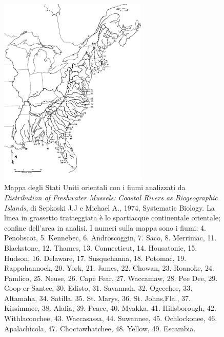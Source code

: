 \documentclass{article} %
\begin{document}
\begin{figure}[H]
    \centering
    \includegraphics[width=0.63\textwidth]{immagini/usa.png}
    \caption{Mappa degli Stati Uniti orientali con i fiumi analizzati da \textit{Distribution of Freshwater Mussels: Coastal Rivers as Biogeographic Islands}, di Sepkoski J.J e Michael A., 1974, Systematic Biology. La linea in grassetto tratteggiata è lo spartiacque continentale orientale; confine dell'area in analisi. I numeri sulla mappa sono i fiumi: 4. Penobscot, 5. Kennebec, 6. Androscoggin, 7. Saco, 8. Merrimac, 11. Blackstone, 12. Thames, 13. Connecticut, 14. Housatonic, 15. Hudson, 16. Delaware, 17. Susquehanna, 18. Potomac, 19. Rappahannock, 20. York, 21. James, 22. Chowan, 23. Roanoke, 24. Pamlico, 25. Neuse, 26. Cape Fear, 27. Waccamaw, 28. Pee Dee, 29. Coop-er-Santee, 30. Edisto, 31. Savannah, 32. Ogeechee, 33. Altamaha, 34. Satilla, 35. St. Marys, 36. St. Johns,Fla., 37. Kissimmee, 38. Alafia, 39. Peace, 40. Myakka, 41. Hillsborough, 42. Withlacoochee, 43. Waccasassa, 44. Suwannee, 45. Ochlockonee, 46. Apalachicola, 47. Choctawhatchee, 48. Yellow, 49. Escambia.}
\end{figure}
\end{document}
